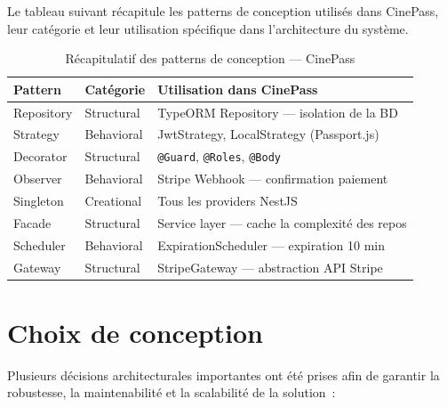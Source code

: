 \documentclass[12pt]{report}
\begin{document}
Le tableau suivant récapitule les patterns de conception utilisés dans CinePass, leur catégorie et leur utilisation spécifique dans l'architecture du système.

\begin{table}[H]
\centering
\label{tab:patterns}
\renewcommand{\arraystretch}{1.4}
\begin{tabular}{|l|l|p{5cm}|}
\hline
\rowcolor{gray!20}
\textbf{Pattern} & \textbf{Catégorie}
                 & \textbf{Utilisation dans CinePass} \\
\hline
Repository    & Structural  &
    TypeORM Repository --- isolation de la BD \\
\hline
Strategy      & Behavioral  &
    JwtStrategy, LocalStrategy (Passport.js) \\
\hline
Decorator     & Structural  &
    \texttt{@Guard}, \texttt{@Roles}, \texttt{@Body} \\
\hline
Observer      & Behavioral  &
    Stripe Webhook --- confirmation paiement \\
\hline
Singleton     & Creational  &
    Tous les providers NestJS \\
\hline
Facade        & Structural  &
    Service layer --- cache la complexité des repos \\
\hline
Scheduler     & Behavioral  &
    ExpirationScheduler --- expiration 10 min \\
\hline
Gateway       & Structural  &
    StripeGateway --- abstraction API Stripe \\
\hline
\end{tabular}
\caption{Récapitulatif des patterns de conception — CinePass}
\end{table}

\section{Choix de conception}

Plusieurs décisions architecturales importantes ont été prises afin de garantir
la robustesse, la maintenabilité et la scalabilité de la solution~:
\end{document}
